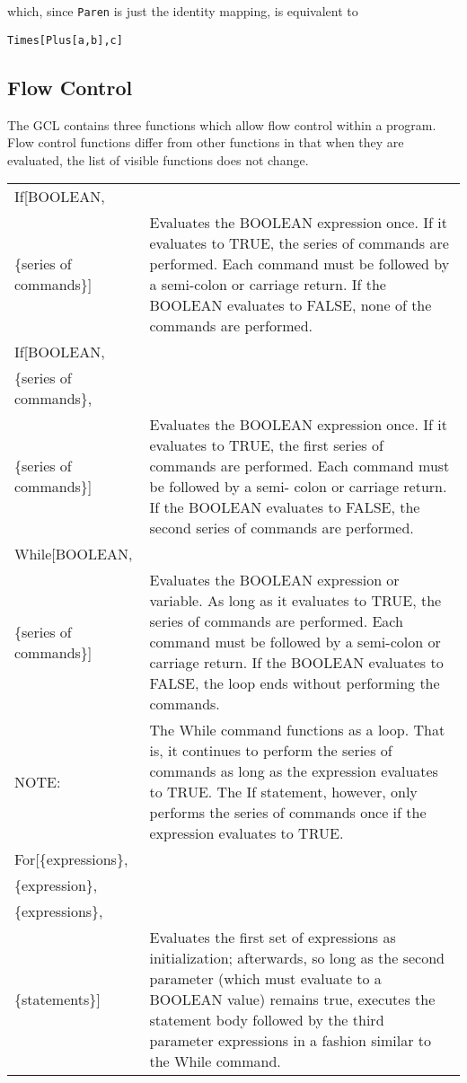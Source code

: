 which, since \verb+Paren+ is just the identity mapping, is equivalent to
\begin{verbatim}
Times[Plus[a,b],c]
\end{verbatim}

\subsection{Flow Control}

The GCL contains three functions which allow flow control within a
program.  Flow control functions differ from other functions in that
when they are evaluated, the list of visible functions does not
change.

\medskip

\begin{tabular}{lp{4in}}
If[BOOLEAN, & \\
\{series of commands\}] & Evaluates the BOOLEAN expression
once. If it evaluates to TRUE, the series of commands are performed.
Each command must be followed by a semi-colon or carriage return.  If
the BOOLEAN evaluates to FALSE, none of the commands are performed.\\
If[BOOLEAN, & \\
\{series of commands\}, & \\
\{series of commands\}] & Evaluates the BOOLEAN expression
once. If it evaluates to TRUE, the first series of commands are
performed.  Each command must be followed by a semi- colon or carriage
return.  If the BOOLEAN evaluates to FALSE, the second series of
commands are performed. \\
While[BOOLEAN, &\\
\{series of commands\}] & Evaluates the BOOLEAN
expression or variable.  As long as it evaluates to TRUE, the series
of commands are performed.  Each command must be followed by a
semi-colon or carriage return.  If the BOOLEAN evaluates to FALSE, the
loop ends without performing the commands.\\
NOTE: & The While command functions as a
loop.  That is, it continues to perform the series of commands as long
as the expression evaluates to TRUE.  The If statement, however, only
performs the series of commands once if the expression evaluates to
TRUE.\\
For[\{expressions\}, & \\
\{expression\}, & \\
\{expressions\}, & \\
\{statements\}] & Evaluates the first set of expressions as initialization;
afterwards, so long as the second parameter (which must evaluate to a 
BOOLEAN value) remains true, executes the statement body followed by the
third parameter expressions in a fashion similar to the While command.
\end{tabular}

